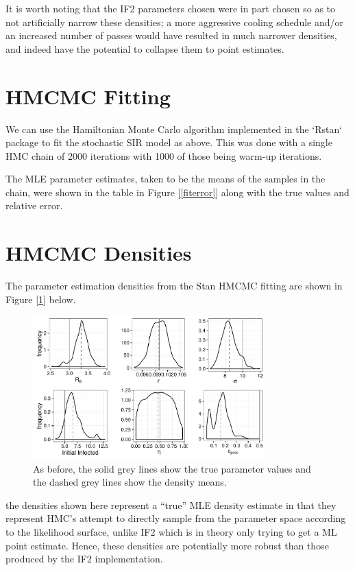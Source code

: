     It is worth noting that the IF2 parameters chosen were in part chosen so as to not artificially narrow these densities; a more aggressive cooling schedule and/or an increased number of passes would have resulted in much narrower densities, and indeed have the potential to collapse them to point estimates.


\section{HMCMC Fitting}

	We can use the Hamiltonian Monte Carlo algorithm implemented in the `Rstan` package to fit the stochastic SIR model as above. This was done with a single HMC chain of 2000 iterations with 1000 of those being warm-up iterations.

	The MLE parameter estimates, taken to be the means of the samples in the chain, were shown in the table in Figure [\ref{fiterror}] along with the true values and relative error.


\section{HMCMC Densities}

	The parameter estimation densities from the Stan HMCMC fitting are shown in Figure [\ref{hmckernels}] below.

	\begin{figure}[H]
        \centering
        \captionsetup{width=.8\linewidth}
        \includegraphics[width=0.8\textwidth]{./images/hmckernels.pdf}
        \caption{As before, the solid grey lines show the true parameter values and the dashed grey lines show the density means.}
        \label{hmckernels}
    \end{figure}

    the densities shown here represent a ``true'' MLE density estimate in that they represent HMC's attempt to directly sample from the parameter space according to the likelihood surface, unlike IF2 which is in theory only trying to get a ML point estimate. Hence, these densities are potentially more robust than those produced by the IF2 implementation.



